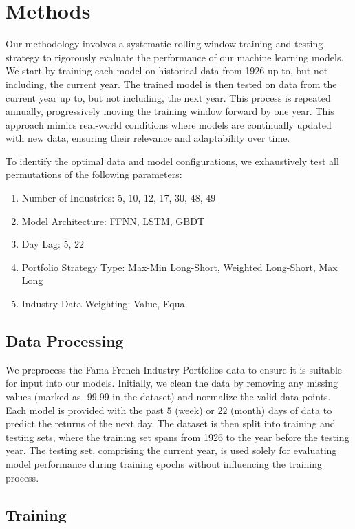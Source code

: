 \documentclass{article}
\begin{document}
\section{Methods}

Our methodology involves a systematic rolling window training and testing strategy to rigorously evaluate the performance of our machine learning models. We start by training each model on historical data from 1926 up to, but not including, the current year. The trained model is then tested on data from the current year up to, but not including, the next year. This process is repeated annually, progressively moving the training window forward by one year. This approach mimics real-world conditions where models are continually updated with new data, ensuring their relevance and adaptability over time.

To identify the optimal data and model configurations, we exhaustively test all permutations of the following parameters:

\begin{enumerate}[label={(\arabic*)}]
    \item {Number of Industries}: 5, 10, 12, 17, 30, 48, 49
    \item {Model Architecture}: FFNN, LSTM, GBDT
    \item {Day Lag}: 5, 22
    \item {Portfolio Strategy Type}: Max-Min Long-Short, Weighted Long-Short, Max Long
    \item {Industry Data Weighting}: Value, Equal
\end{enumerate}

\subsection{Data Processing}
We preprocess the Fama French Industry Portfolios data to ensure it is suitable for input into our models. Initially, we clean the data by removing any missing values (marked as -99.99 in the dataset) and normalize the valid data points. Each model is provided with the past $5$ (week) or $22$ (month) days of data to predict the returns of the next day. The dataset is then split into training and testing sets, where the training set spans from 1926 to the year before the testing year. The testing set, comprising the current year, is used solely for evaluating model performance during training epochs without influencing the training process.

\subsection{Training}
\end{document}
